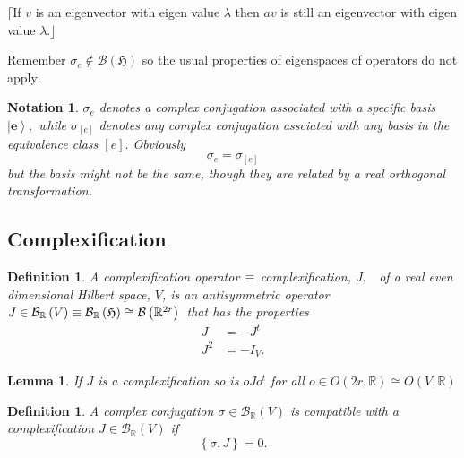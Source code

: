 \documentclass[aps,preprint]{revtex4}
\newtheorem{definition}[theorem]{Definition}
\newtheorem{lemma}[theorem]{Lemma}
\newtheorem{notation}[theorem]{Notation}
\begin{document}
$\lceil$If $v$ is an eigenvector with eigen value $\lambda$ then $av$ is
still an eigenvector with eigen value $\lambda.\rfloor$

Remember $\sigma_{e}\notin\mathcal{B}\left( \mathfrak{H}\right) $ so the
usual properties of eigenspaces of operators do not apply$.$

\begin{notation}
$\sigma_{e}$ denotes a complex conjugation associated with a specific basis $%
\left\vert \mathbf{e}\right\rangle ,$ while $\sigma_{\left[ e\right] }$
denotes any complex conjugation assciated with any basis in the equivalence
class $\left[ e\right] .$ Obviously 
\begin{equation}
\sigma_{e}=\sigma_{\left[ e\right] }
\end{equation}
but the basis might not be the same, though they are related by a real
orthogonal transformation.
\end{notation}

\subsection{Complexification}

\begin{definition}
A \emph{complexification operator}$\,\equiv\,$\emph{complexification, }$J,$%
\emph{\ }of a real even dimensional Hilbert space, $V$, is an antisymmetric
operator $J\in\mathcal{B}_{\mathbb{R}}\left( V\right) \equiv\mathcal{B}_{%
\mathbb{R}}\left( \mathfrak{H}\right) \cong\mathcal{B}\left( \mathbb{R}%
^{2r}\right) $\emph{\ }that has the properties\emph{\ }%
\begin{align}
J & =-J^{t} \\
J^{2} & =-I_{V}.
\end{align}
\end{definition}

\begin{lemma}
If $J$ is a complexification so is $oJo^{t}$ for all $o\in O\left( 2r,%
\mathbb{R}\right) \cong O\left( V,\mathbb{R}\right) $
\end{lemma}

\begin{definition}
A complex conjugation $\sigma\in\mathcal{B}_{\mathbb{R}}\left( V\right) $ is 
\emph{compatible} with a complexification $J\in\mathcal{B}_{\mathbb{R}%
}\left( V\right) $ if 
\begin{equation}
\left\{ \sigma,J\right\} =0.
\end{equation}
\end{definition}
\end{document}
